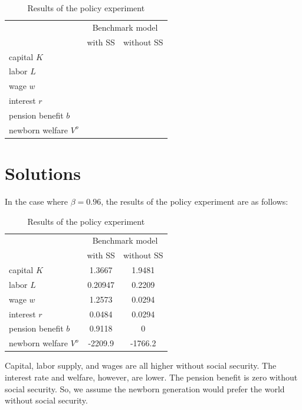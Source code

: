 \documentclass[10pt,a4paper]{article}
\begin{document}
\begin{table}[h]
\centering
\begin{tabular}{|l|c|c|}
\hline
 & \multicolumn{2}{c|}{Benchmark model} \\
\cline{2-3}
 & with SS & without SS \\
\hline
capital $K$ & & \\
\hline
labor $L$ & & \\
\hline
wage $w$ & & \\
\hline
interest $r$ & & \\
\hline
pension benefit $b$ & & \\
\hline
newborn welfare $V^o$ & & \\
\hline
\end{tabular}
\caption{Results of the policy experiment}
\end{table}

\section*{Solutions}

In the case where $\beta = 0.96$, the results of the policy experiment are as follows:

\begin{table}[h]
\centering
\begin{tabular}{|l|c|c|}
\hline
 & \multicolumn{2}{c|}{Benchmark model} \\
\cline{2-3}
 & with SS & without SS \\
\hline
capital $K$ & 1.3667 & 1.9481 \\
\hline
labor $L$ & 0.20947 & 0.2209 \\
\hline
wage $w$ & 1.2573 & 0.0294 \\
\hline
interest $r$ & 0.0484 & 0.0294 \\
\hline
pension benefit $b$ & 0.9118 & 0 \\
\hline
newborn welfare $V^o$ & -2209.9 & -1766.2 \\
\hline
\end{tabular}
\caption{Results of the policy experiment}
\end{table}

Capital, labor supply, and wages are all higher without social security. The interest rate and welfare, however, are lower. The pension benefit is zero without social security.
So, we assume the newborn generation would prefer the world without social security. 
\end{document}
